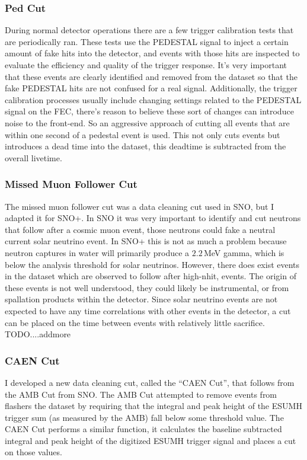 \subsubsection{Ped Cut}
During normal detector operations there are a few trigger calibration
tests that are periodically ran.
These tests use the PEDESTAL signal to inject a certain amount of fake hits
into the detector, and events with those hits are inspected to evaluate the efficiency and
quality of the trigger response.
It's very important that these events are clearly identified and removed from the
dataset so that the fake PEDESTAL hits are not confused for a real signal.
Additionally, the trigger calibration processes usually include changing settings
related to the PEDESTAL signal on the FEC, there's reason to believe these sort
of changes can introduce noise to the front-end.
So an aggressive approach of cutting all events that are within one second of
a pedestal event is used.
This not only cuts events but introduces a dead time into the dataset,
this deadtime is subtracted from the overall livetime.

\subsubsection{Missed Muon Follower Cut}
The missed muon follower cut was a data cleaning cut used in SNO, but I adapted
it for SNO+.
In SNO it was very important to identify and cut neutrons that follow
after a cosmic muon event, those neutrons could fake
a neutral current solar neutrino event.
In SNO+ this is not as much a problem because neutron captures in water will
primarily produce a $2.2$\,MeV gamma, which is below the analysis threshold for
solar neutrinos.
However, there does exist events in the dataset which are observed to follow
after high-nhit, events. The origin of these events is not well understood, they
could likely be instrumental, or from  spallation products within the detector.
Since solar neutrino events are not expected to have any time correlations
with other events in the detector, a cut can be placed on the time between
events with relatively little sacrifice.\\
TODO....addmore


\subsubsection{CAEN Cut}
I developed a new data cleaning cut, called the ``CAEN Cut'', that follows from
the AMB Cut from SNO.\@
The AMB Cut attempted to remove events from flashers the dataset by requiring
that the integral and peak height of the ESUMH trigger sum (as measured by the
AMB) fall below some threshold value.
The CAEN Cut performs a similar function, it calculates the baseline subtracted
integral and peak height of the digitized ESUMH trigger signal and places a cut on those values.

